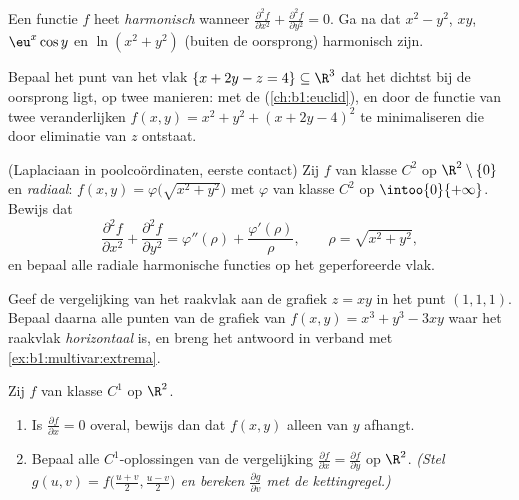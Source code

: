 \begin{exercise}[$\star\star$]\label{exo:b1:multivar:7}
Een functie $f$ heet \emph{harmonisch} wanneer $\frac{\partial^2
f}{\partial x^2} + \frac{\partial^2 f}{\partial y^2} = 0$. Ga na dat
$x^2 - y^2$, $xy$, $\eu^x\cos y$ en $\ln(x^2 + y^2)$ (buiten de
oorsprong) harmonisch zijn.
\end{exercise}

\begin{exercise}[$\star\star\star$]\label{exo:b1:multivar:8}
Bepaal het punt van het vlak $\{x + 2y - z = 4\} \subseteq \R^3$
dat het dichtst bij de oorsprong ligt, op twee manieren: met de
 (\cref{ch:b1:euclid}), en door de functie van
twee veranderlijken $f(x, y) = x^2 + y^2 + (x + 2y - 4)^2$ te
minimaliseren die door eliminatie van $z$ ontstaat.
\end{exercise}

\begin{exercise}[$\star\star\star$]\label{exo:b1:multivar:9}
(Laplaciaan in poolcoördinaten, eerste contact) Zij $f$ van klasse
$C^2$ op $\R^2 \setminus \{0\}$ en \emph{radiaal}: $f(x, y) =
\varphi\bigl(\sqrt{x^2+y^2}\bigr)$ met $\varphi$ van klasse $C^2$
op $\intoo{0}{+\infty}$. Bewijs dat
\[
\frac{\partial^2 f}{\partial x^2} + \frac{\partial^2 f}{\partial
y^2} = \varphi''(\rho) + \frac{\varphi'(\rho)}{\rho},
\qquad \rho = \sqrt{x^2 + y^2},
\]
en bepaal alle radiale harmonische functies op het geperforeerde
vlak.
\end{exercise}

\begin{exercise}[$\star\star$]\label{exo:b1:multivar:10}
Geef de vergelijking van het raakvlak aan de grafiek $z = xy$ in
het punt $(1, 1, 1)$. Bepaal daarna alle punten van de grafiek van
$f(x,y) = x^3 + y^3 - 3xy$ waar het raakvlak \emph{horizontaal} is,
en breng het antwoord in verband met
\cref{ex:b1:multivar:extrema}.
\end{exercise}

\begin{exercise}[$\star\star$]\label{exo:b1:multivar:11}
Zij $f$ van klasse $C^1$ op $\R^2$.
\begin{enumerate}
  \item Is $\frac{\partial f}{\partial x} = 0$ overal, bewijs dan
        dat $f(x, y)$ alleen van $y$ afhangt.
  \item Bepaal alle $C^1$-oplossingen van de vergelijking
        $\frac{\partial f}{\partial x} = \frac{\partial f}{\partial
        y}$ op $\R^2$. \emph{(Stel $g(u, v) =
        f\bigl(\frac{u+v}2, \frac{u-v}2\bigr)$ en bereken
        $\frac{\partial g}{\partial v}$ met de kettingregel.)}
\end{enumerate}
\end{exercise}


